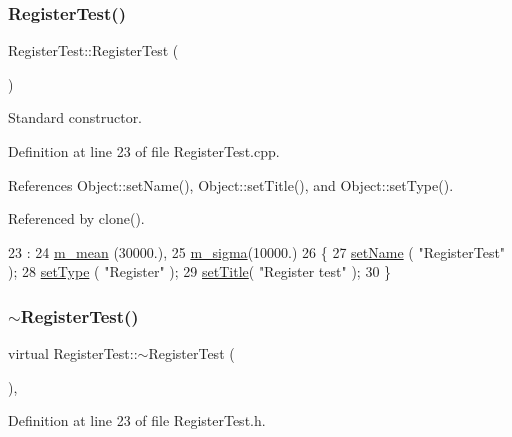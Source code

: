 \subsubsection{\texorpdfstring{Register\+Test()}{RegisterTest()}}
{\footnotesize\ttfamily Register\+Test\+::\+Register\+Test (\begin{DoxyParamCaption}{ }\end{DoxyParamCaption})}



Standard constructor. 



Definition at line 23 of file Register\+Test.\+cpp.



References Object\+::set\+Name(), Object\+::set\+Title(), and Object\+::set\+Type().



Referenced by clone().


\begin{DoxyCode}
23                              :
24   \hyperlink{classRegisterTest_aba5ac8088017236617d2244fc0c261b9}{m\_mean} (30000.),
25   \hyperlink{classRegisterTest_a17f1f3646bf00ae7ab6744afca9e6813}{m\_sigma}(10000.)
26   \{
27   \hyperlink{classObject_ae30fea75683c2d149b6b6d17c09ecd0c}{setName} ( \textcolor{stringliteral}{"RegisterTest"} );
28   \hyperlink{classObject_aae534cc9d982bcb9b99fd505f2e103a5}{setType} ( \textcolor{stringliteral}{"Register"} );
29   \hyperlink{classObject_a89557dbbad5bcaa02652f5d7fa35d20f}{setTitle}( \textcolor{stringliteral}{"Register test"} );
30 \}
\end{DoxyCode}
\mbox{\label{classRegisterTest_aa52cee0f106fabf76ee320c391ec94a2}} 
\subsubsection{\texorpdfstring{$\sim$\+Register\+Test()}{~RegisterTest()}}
{\footnotesize\ttfamily virtual Register\+Test\+::$\sim$\+Register\+Test (\begin{DoxyParamCaption}{ }\end{DoxyParamCaption})\hspace{0.3cm}{\ttfamily [inline]}, {\ttfamily [virtual]}}



Definition at line 23 of file Register\+Test.\+h.



